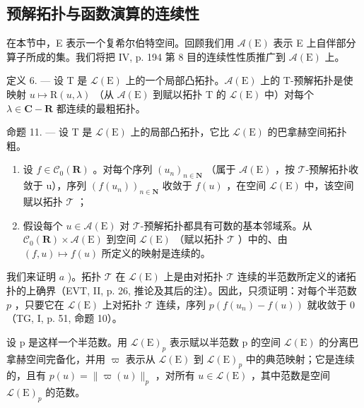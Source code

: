 \subsection{预解拓扑与函数演算的连续性}

在本节中，E 表示一个复希尔伯特空间。回顾我们用 \(\mathcal{A}(\mathrm{E})\) 表示 E 上自伴部分算子所成的集。我们将把 IV, p. 194 第 8 目的连续性性质推广到 \(\mathcal{A}(\mathrm{E})\) 上。

定义 6. --- 设 T 是 \(\mathcal{L}(\mathrm{E})\) 上的一个局部凸拓扑。\(\mathcal{A}(\mathrm{E})\) 上的 T-预解拓扑是使映射 \(u \mapsto \mathrm{R}(u, \lambda)\) （从 \(\mathcal{A}(\mathrm{E})\) 到赋以拓扑 T 的 \(\mathcal{L}(\mathrm{E})\) 中）对每个 \(\lambda \in \mathbf{C} - \mathbf{R}\) 都连续的最粗拓扑。

命题 11. --- 设 T 是 \(\mathcal{L}(\mathrm{E})\) 上的局部凸拓扑，它比 \(\mathcal{L}(\mathrm{E})\) 的巴拿赫空间拓扑粗。

\begin{enumerate}
\def\labelenumi{\alph{enumi})}
\item
  设 \(f \in \mathcal{C}_0(\mathbf{R})\) 。对每个序列 \((u_n)_{n \in \mathbf{N}}\) （属于 \(\mathcal{A}(\mathrm{E})\) ，按 \(\mathcal{T}\)-预解拓扑收敛于 u），序列 \((f(u_n))_{n \in \mathbf{N}}\) 收敛于 \(f(u)\) ，在空间 \(\mathcal{L}(\mathrm{E})\) 中，该空间赋以拓扑 \(\mathcal{T}\) ；
\item
  假设每个 \(u \in \mathcal{A}(\mathrm{E})\) 对 \(\mathcal{T}\)-预解拓扑都具有可数的基本邻域系。从 \(\mathcal{C}_0(\mathbf{R}) \times \mathcal{A}(\mathrm{E})\) 到空间 \(\mathcal{L}(\mathrm{E})\) （赋以拓扑 \(\mathcal{T}\) ）中的、由 \((f, u) \mapsto f(u)\) 所定义的映射是连续的。
\end{enumerate}

我们来证明 \(a\) )。拓扑 \(\mathcal{T}\) 在 \(\mathcal{L}(\mathrm{E})\) 上是由对拓扑 \(\mathcal{T}\) 连续的半范数所定义的诸拓扑的上确界（EVT, II, p. 26, 推论及其后的注）。因此，只须证明：对每个半范数 \(p\) ，只要它在 \(\mathcal{L}(\mathrm{E})\) 上对拓扑 \(\mathcal{T}\) 连续，序列 \(p(f(u_n) - f(u))\) 就收敛于 0（TG, I, p. 51, 命题 10）。

设 p 是这样一个半范数。用 \(\mathcal{L}(\mathrm{E})_{p}\) 表示赋以半范数 p 的空间 \(\mathcal{L}(\mathrm{E})\) 的分离巴拿赫空间完备化，并用 \(\varpi\) 表示从 \(\mathcal{L}(\mathrm{E})\) 到 \(\mathcal{L}(\mathrm{E})_{p}\) 中的典范映射；它是连续的，且有 \(p(u) = \|\varpi(u)\|_{p}\) ，对所有 \(u \in \mathcal{L}(\mathrm{E})\) ，其中范数是空间 \(\mathcal{L}(\mathrm{E})_{p}\) 的范数。


